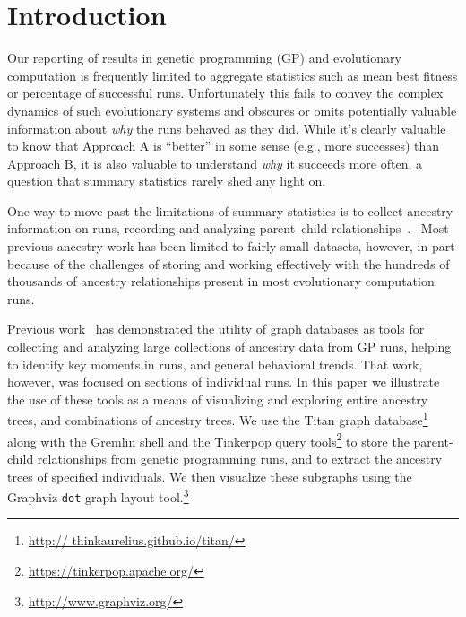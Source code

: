 \documentclass{sig-alternate}
\begin{document}

\printccsdesc


\section{Introduction}
\label{sec:introduction}

Our reporting of results in genetic programming (GP) and evolutionary computation 
is frequently limited to aggregate statistics such as mean best fitness or 
percentage of successful runs. Unfortunately this fails to convey the complex 
dynamics of such evolutionary systems and obscures or omits potentially valuable 
information about \emph{why} the runs behaved as they did. While it's clearly
valuable to know that Approach A is ``better'' in some sense (e.g., more successes)
than Approach B, it is also valuable to understand \emph{why} it succeeds more 
often, a question that summary statistics rarely shed any light on.

One way to move past the limitations of summary statistics is to collect ancestry
information on runs, recording and analyzing parent--child 
relationships~\cite{burlacu2013visualization,cruz2015elicit,hart2001gavel,vaseux2013event}. \
Most previous ancestry
work has been limited to fairly small datasets, however, in part because of the
challenges of storing and working effectively with the hundreds of thousands of
ancestry relationships present in most evolutionary computation runs.

Previous work~\cite{McPhee:2015:GPTP} has demonstrated the utility of graph databases as 
tools for collecting and analyzing large collections of ancestry data from GP runs,
helping to identify key moments in runs, and general behavioral trends. That work,
however, was focused on sections of individual runs. In this paper we illustrate the 
use of these tools as a means of visualizing and exploring entire 
ancestry trees, and combinations of ancestry trees. 
We use the Titan graph database\footnote{\url{http://
thinkaurelius.github.io/titan/}} along with the Gremlin shell and the Tinkerpop query 
tools\footnote{\url{https://tinkerpop.apache.org/}} to store the parent-child 
relationships from genetic programming runs, and to extract the ancestry trees of 
specified individuals. We then visualize these subgraphs using the Graphviz \texttt{dot} 
graph layout tool.\footnote{\url{http://www.graphviz.org/}}
\end{document}
